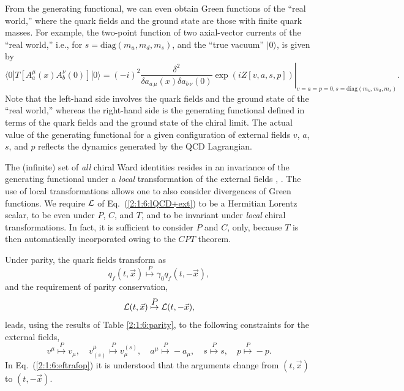 \documentclass[twoside,12pt]{article}
\begin{document}
   From the generating functional,  we can even obtain Green functions of the
``real world,'' where the  quark fields and the ground state are those with
finite quark masses.
   For example, the two-point function of two
axial-vector currents of the ``real world,'' i.e., for
$s=\mbox{diag}(m_u,m_d,m_s)$, and the ``true vacuum'' $|0\rangle$,
is given by
\begin{equation}
\label{2:1:6:grw}
\langle 0|T[A^\mu_a(x) A^\nu_b(0)]|0\rangle =\left.
(-i)^2 \frac{\delta^2}{\delta a_{a\,\mu}(x)\delta
a_{b\,\nu}(0)}
\exp(iZ[v,a,s,p])\right|_{v=a=p=0,s=\mbox{diag}(m_u,m_d,m_s)}.
\end{equation}
   Note that the left-hand side involves the quark fields and the ground state of the
``real world,'' whereas the right-hand side is the generating functional defined in
terms of the quark fields and the ground state of the chiral limit.
   The actual value of the generating functional for a given
configuration of external fields $v$, $a$, $s$, and $p$ reflects the
dynamics generated by the QCD Lagrangian.

   The (infinite) set of {\em all} chiral Ward identities resides in an
invariance of the generating functional under a {\em local}
transformation of the external fields \cite{Gasser:1983yg}, \cite{Leutwyler:1993iq}.
   The use of local transformations allows one to also consider divergences
of Green functions.
   We require $\cal L$ of Eq.~(\ref{2:1:6:lQCD+ext}) to be a Hermitian Lorentz scalar, to be
even under $P$, $C$, and $T$, and to be invariant under {\em local} chiral transformations.
  In fact, it is sufficient to consider $P$ and $C$, only, because
$T$ is then automatically incorporated owing to the $CPT$ theorem.

   Under parity, the quark fields transform as
\begin{equation}
\label{2:1:6:qtrafop}
q_f(t,\vec{x})\stackrel{\mbox{$P$}}{\mapsto}\gamma_0 q_f(t,-\vec{x}),
\end{equation}
   and the requirement of parity conservation,
\begin{equation}
\label{2:1:6:parinv}
{\cal L}(t,\vec{x}) \stackrel{\mbox{$P$}}{\mapsto} {\cal L}(t,-\vec{x}),
\end{equation}
leads, using the results of Table \ref{2:1:6:parity}, to the following
constraints for the external fields,
\begin{equation}
\label{2:1:6:eftrafop}
v^\mu\stackrel{\mbox{$P$}}{\mapsto}v_\mu,\quad
v^\mu_{(s)}\stackrel{\mbox{$P$}}{\mapsto}v_\mu^{(s)},\quad
a^\mu\stackrel{\mbox{$P$}}{\mapsto}-a_\mu,\quad
s\stackrel{\mbox{$P$}}{\mapsto}s,\quad
p\stackrel{\mbox{$P$}}{\mapsto}-p.
\end{equation}
   In Eq.\ (\ref{2:1:6:eftrafop}) it is understood that the arguments change
from $(t,\vec{x})$ to $(t,-\vec{x})$.
\end{document}
